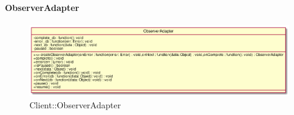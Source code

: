 \hypertarget{ObserverAdapter_label}{\paragraph{ObserverAdapter}}
\begin{figure}[h]
	\centering
	\includegraphics[width=\textwidth,height=\textheight,keepaspectratio]{images/ClassObserverAdapter.png}
	\caption{Client::ObserverAdapter}
\end{figure}
